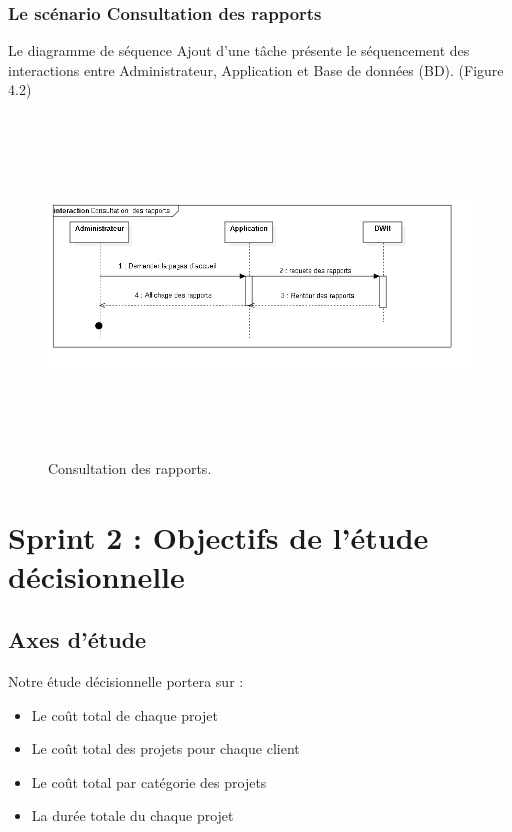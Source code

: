 \subsubsection{Le sc\'{e}nario \guillemotleft{} Consultation des rapports\guillemotright{}}
Le diagramme de s\'{e}quence \guillemotleft{} Ajout d'une t\^{a}che \guillemotright{} pr\'{e}sente le s\'{e}quencement
des interactions entre Administrateur, Application et Base de donn\'{e}es (BD). (Figure 4.2)


\begin{figure}[H]
\center
\includegraphics[width=14cm,height=9cm]{./figures/seq/G.png}
\caption{Consultation des rapports.}
\end{figure}


\section{ Sprint 2 : Objectifs de l'\'{e}tude d\'{e}cisionnelle }


\subsection{Axes d'\'{e}tude}
Notre \'{e}tude d\'{e}cisionnelle portera sur :

\begin{itemize}
  \item { Le co\^{u}t total de chaque projet}
  \item { Le co\^{u}t total des projets pour chaque client }
  \item { Le co\^{u}t total par cat\'{e}gorie des projets }
  \item { La dur\'{e}e totale du chaque projet }

\end{itemize}

